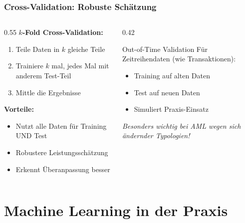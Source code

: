 \documentclass[11pt, aspectratio=169]{beamer}
\begin{document}
\begin{frame}
    \frametitle{Cross-Validation: Robuste Schätzung}
    \begin{columns}[t]
        \begin{column}{0.55\textwidth}
            \textbf{$k$-Fold Cross-Validation:}
            \begin{enumerate}
                \item Teile Daten in $k$ gleiche Teile
                \item Trainiere $k$ mal, jedes Mal mit anderem Test-Teil
                \item Mittle die Ergebnisse
            \end{enumerate}
            \vspace{0.3cm}
            \textbf{Vorteile:}
            \begin{itemize}
                \item Nutzt alle Daten für Training UND Test
                \item Robustere Leistungsschätzung
                \item Erkennt Überanpassung besser
            \end{itemize}
        \end{column}
        \begin{column}{0.42\textwidth}
            \begin{block}{Out-of-Time Validation}
                Für Zeitreihendaten (wie Transaktionen):
                \begin{itemize}
                    \item Training auf alten Daten
                    \item Test auf neuen Daten
                    \item Simuliert Praxis-Einsatz
                \end{itemize}
                \vspace{0.2cm}
                \textit{Besonders wichtig bei AML wegen sich ändernder Typologien!}
            \end{block}
        \end{column}
    \end{columns}
\end{frame}

\section{Machine Learning in der Praxis}
\end{document}
